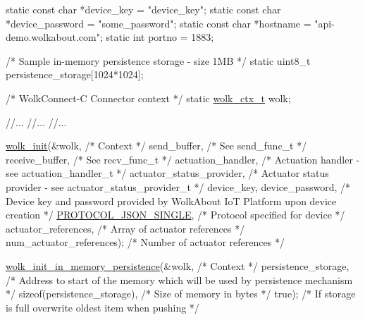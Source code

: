 \begin{DoxyCode}
\textcolor{keyword}{static} \textcolor{keyword}{const} \textcolor{keywordtype}{char} *device\_key = \textcolor{stringliteral}{"device\_key"};
\textcolor{keyword}{static} \textcolor{keyword}{const} \textcolor{keywordtype}{char} *device\_password = \textcolor{stringliteral}{"some\_password"};
\textcolor{keyword}{static} \textcolor{keyword}{const} \textcolor{keywordtype}{char} *hostname = \textcolor{stringliteral}{"api-demo.wolkabout.com"};
\textcolor{keyword}{static} \textcolor{keywordtype}{int} portno = 1883;

\textcolor{comment}{/* Sample in-memory persistence storage - size 1MB */}
\textcolor{keyword}{static} uint8\_t persistence\_storage[1024*1024];

\textcolor{comment}{/* WolkConnect-C Connector context */}
\textcolor{keyword}{static} \hyperlink{structwolk__ctx}{wolk\_ctx\_t} wolk;

\textcolor{comment}{//...}
\textcolor{comment}{//...}
\textcolor{comment}{//...}

\hyperlink{wolk__connector_8h_a607b5439ae7741284a73312b7794fa7a}{wolk\_init}(&wolk,                                             \textcolor{comment}{/* Context */}
          send\_buffer,                                       \textcolor{comment}{/* See send\_func\_t */}
          receive\_buffer,                                    \textcolor{comment}{/* See recv\_func\_t */}
          actuation\_handler,                                 \textcolor{comment}{/* Actuation handler        - see
       actuation\_handler\_t */}
          actuator\_status\_provider,                          \textcolor{comment}{/* Actuator status provider - see
       actuator\_status\_provider\_t */}
          device\_key, device\_password,                       \textcolor{comment}{/* Device key and password provided by
       WolkAbout IoT Platform upon device creation */}
          \hyperlink{wolk__connector_8h_a91e19fa4fff461493e1a41f7c7aa4e5fa9574b7cae2523f47c59e082e473223bd}{PROTOCOL\_JSON\_SINGLE},                              \textcolor{comment}{/* Protocol specified for
       device */}
          actuator\_references,                               \textcolor{comment}{/* Array of actuator references */}
          num\_actuator\_references);                          \textcolor{comment}{/* Number of actuator references */}

\hyperlink{wolk__connector_8h_a0fbb983c6b65072501b078ba6ff8e5ad}{wolk\_init\_in\_memory\_persistence}(&wolk,                       \textcolor{comment}{/* Context */}
                                persistence\_storage,         \textcolor{comment}{/* Address to start of the memory which will
       be used by persistence mechanism */}
                                \textcolor{keyword}{sizeof}(persistence\_storage), \textcolor{comment}{/* Size of memory in bytes */}
                                \textcolor{keyword}{true});                       \textcolor{comment}{/* If storage is full overwrite oldest item
       when pushing */}
\end{DoxyCode}
